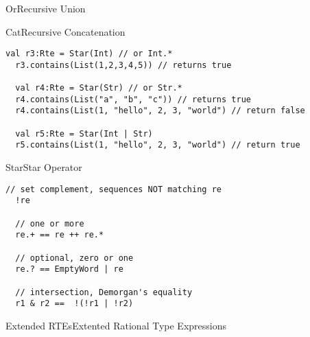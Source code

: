 \begin{frame}{Or}{Recursive Union}
  \usebox\orbox
 \end{frame}

\begin{frame}{Cat}{Recursive Concatenation}
  \usebox\catbox
 \end{frame}



\newsavebox\starbox
\begin{lrbox}{\starbox}
  \begin{minipage}{12cm}
\begin{lstlisting}[style=scalaioScala]
  val r3:Rte = Star(Int) // or Int.*
  r3.contains(List(1,2,3,4,5)) // returns true

  val r4:Rte = Star(Str) // or Str.*
  r4.contains(List("a", "b", "c")) // returns true
  r4.contains(List(1, "hello", 2, 3, "world") // return false

  val r5:Rte = Star(Int | Str) 
  r5.contains(List(1, "hello", 2, 3, "world") // return true
\end{lstlisting}
  \end{minipage}
\end{lrbox}


\begin{frame}{Star}{Star Operator}
  \usebox\starbox
\end{frame}


\newsavebox\extendedbox
\begin{lrbox}{\extendedbox}
  \begin{minipage}{12cm}
\begin{lstlisting}[style=scalaioScala]
  // set complement, sequences NOT matching re
  !re 

  // one or more
  re.+ == re ++ re.*

  // optional, zero or one
  re.? == EmptyWord | re

  // intersection, Demorgan's equality
  r1 & r2 ==  !(!r1 | !r2)
\end{lstlisting}
  \end{minipage}
\end{lrbox}

\begin{frame}{Extended RTEs}{Extented Rational Type Expressions}
  \usebox\extendedbox
\end{frame}

